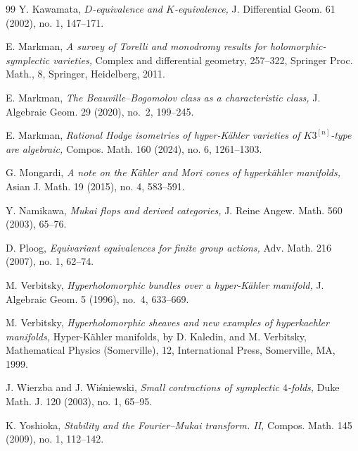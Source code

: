 \documentclass[11pt]{amsart}
\theoremstyle{plain}
\theoremstyle{definition}
\theoremstyle{remark}
\begin{document}
\begin{thebibliography}{99}
 Y. Kawamata, {\em $D$-equivalence and $K$-equivalence,} J. Differential Geom. 61 (2002), no. 1, 147--171.

 E. Markman, {\em A survey of Torelli and monodromy results for holomorphic-symplectic varieties,} Complex and differential geometry, 257--322, Springer Proc. Math., 8, Springer, Heidelberg, 2011.


 E. Markman, {\em The Beauville--Bogomolov class as a characteristic class,} J. Algebraic Geom. 29 (2020), no.~2, 199--245.


 E. Markman, {\em Rational Hodge isometries of hyper-K\"ahler varieties of $K3^{[n]}$-type are algebraic,} Compos. Math. 160 (2024), no. 6, 1261--1303.

 G. Mongardi, {\em A note on the K\"ahler and Mori cones of hyperk\"ahler manifolds,} Asian J. Math. 19 (2015), no. 4, 583--591.


 Y. Namikawa, {\em Mukai flops and derived categories,} J. Reine Angew. Math. 560 (2003), 65--76.

 D. Ploog, {\em Equivariant equivalences for finite group actions,} Adv. Math. 216 (2007), no. 1, 62--74.


 M. Verbitsky, {\em Hyperholomorphic bundles over a hyper-K\"ahler manifold,} J. Algebraic Geom. 5 (1996), no.~4, 633--669.

 M. Verbitsky, {\em Hyperholomorphic sheaves and new examples of hyperkaehler manifolds,} Hyper-K\"ahler manifolds, by D. Kaledin, and M. Verbitsky, Mathematical Physics (Somerville), 12, International Press, Somerville, MA, 1999.

 J. Wierzba and J. Wi\'sniewski, {\em 
Small contractions of symplectic $4$-folds,} Duke Math. J. 120 (2003), no. 1, 65--95.

 K. Yoshioka, {\em Stability and the Fourier--Mukai transform. II,} Compos. Math. 145 (2009), no. 1, 112--142.

\end{thebibliography}
\end{document}
